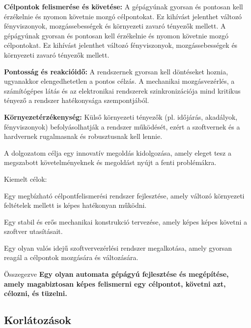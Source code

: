 \documentclass[12pt,a4paper]{article}
\begin{document}
\begin{list}{}{}
	\item \textbf{Célpontok felismerése és követése:} A gépágyúnak gyorsan és pontosan kell érzékelnie és nyomon követnie mozgó célpontokat. Ez kihívást jelenthet változó fényviszonyok, mozgássebességek és környezeti zavaró tényezők mellett. A gépágyúnak gyorsan és pontosan kell érzékelnie és nyomon követnie mozgó célpontokat. Ez kihívást jelenthet változó fényviszonyok, mozgássebességek és környezeti zavaró tényezők mellett. \\
	\item \textbf{Pontosság és reakcióidő:} A rendszernek gyorsan kell döntéseket hoznia, ugyanakkor elengedhetetlen a pontos célzás. A mechanikai mozgásvezérlés, a számítógépes látás és az elektronikai rendszerek szinkronizációja mind kritikus tényező a rendszer hatékonysága szempontjából. \\
	\item \textbf{Környezetérzékenység:} Külső környezeti tényezők (pl. időjárás, akadályok, fényviszonyok) befolyásolhatják a rendszer működését, ezért a szoftvernek és a hardvernek rugalmasnak és robusztusnak kell lennie. 
\end{list}
A dolgozatom célja egy innovatív megoldás kidolgozása, amely eleget tesz a megszabott követelményeknek és megoldást nyújt a fenti problémákra. \\

\pagebreak

Kiemelt célok:
\begin{list}{}{}
	\item Egy megbízható célpontfelismerési rendszer fejlesztése, amely változó környezeti feltételek mellett is képes hatékonyan működni.
	\item Egy stabil és erős mechanikai konstrukció tervezése, amely képes képes követni a szoftver utasításait.
	\item Egy olyan valós idejű szoftvervezérlési rendszer megalkotása, amely gyorsan reagál a célpontok mozgására és változására.
\end{list}

Összegezve \textbf{Egy olyan automata gépágyú fejlesztése és megépítése, amely magabiztosan képes felismerni egy célpontot, követni azt, célozni, és tüzelni.}

\subsection{Korlátozások}
\end{document}
